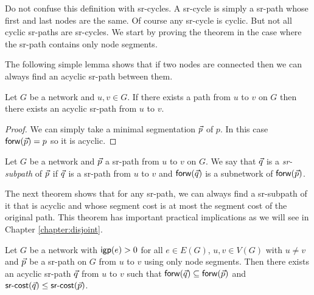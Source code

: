 Do not confuse this definition with sr-cycles. A sr-cycle is simply a sr-path whose first and last nodes are the same.
Of course any sr-cycle is cyclic. But not all cyclic sr-paths are sr-cycles. We start by proving the theorem in the case
where the sr-path contains only node segments.

The following simple lemma shows that if two nodes are connected then we can always find an acyclic sr-path between them.

\begin{lemma}
Let $G$ be a network and $u, v \in G$. If there exists a path from $u$ to $v$ on $G$ then there exists an acyclic sr-path
from $u$ to $v$.
\end{lemma}

\begin{proof}
We can simply take a minimal segmentation $\vec{p}$ of $p$. In this case $\mathsf{forw}(\vec{p}) = p$ so it is acyclic.
\end{proof}

\begin{definition}
Let $G$ be a network and $\vec{p}$ a sr-path from $u$ to $v$ on $G$. We say that $\vec{q}$ is a \emph{sr-subpath} of $\vec{p}$ if 
$\vec{q}$ is a sr-path from $u$ to $v$ and $\mathsf{forw}(\vec{q})$ is a subnetwork of $\mathsf{forw}(\vec{p})$.
\end{definition}

The next theorem shows that for any sr-path, we can always find a sr-subpath of it that is acyclic and whose segment
cost is at most the segment cost of the original path. This theorem has important practical implications as we will
see in Chapter \ref{chapter:disjoint}.

\begin{theorem}
\label{thm:sracyclic_noadj}
Let $G$ be a network with $\mathsf{igp}(e) > 0$ for all $e \in E(G)$, $u, v \in V(G)$ with $u \neq v$ and $\vec{p}$ be a sr-path on $G$ from $u$ to $v$ using only node segments. 
Then there exists an acyclic sr-path $\vec{q}$ from $u$ to $v$
such that $\mathsf{forw}(\vec{q}) \subseteq \mathsf{forw}(\vec{p})$ and $\textsf{sr-cost}(\vec{q}) \leq \textsf{sr-cost}(\vec{p})$.
\end{theorem}

